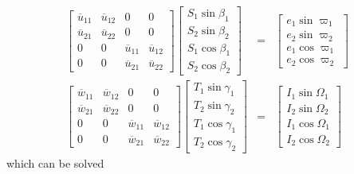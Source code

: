 \documentclass [12pt, a4paper] {article}
\begin{document}
\begin {eqnarray}
    \begin {bmatrix}
        \overline{u}_{11} & \overline{u}_{12} & 0 & 0 \\
        \overline{u}_{21} & \overline{u}_{22} & 0 & 0 \\
        0 & 0 & \overline{u}_{11} & \overline{u}_{12} \\
        0 & 0 & \overline{u}_{21} & \overline{u}_{22}
    \end {bmatrix}
    \begin {bmatrix}
        S_1\sin\beta_1 \\
        S_2\sin\beta_2 \\
        S_1\cos\beta_1 \\
        S_2\cos\beta_2 
    \end {bmatrix}
    &=& 
    \begin {bmatrix}
        e_1\sin\varpi_1 \\
        e_2\sin\varpi_2 \\
        e_1\cos\varpi_1 \\
        e_2\cos\varpi_2
    \end {bmatrix}
    \\
    \begin {bmatrix}
        \overline{w}_{11} & \overline{w}_{12} & 0 & 0 \\
        \overline{w}_{21} & \overline{w}_{22} & 0 & 0 \\
        0 & 0 & \overline{w}_{11} & \overline{w}_{12} \\
        0 & 0 & \overline{w}_{21} & \overline{w}_{22}
    \end {bmatrix}
    \begin {bmatrix}
        T_1\sin\gamma_1 \\
        T_2\sin\gamma_2 \\
        T_1\cos\gamma_1 \\
        T_2\cos\gamma_2 
    \end {bmatrix}
    &=& 
    \begin {bmatrix}
        I_1\sin\Omega_1 \\
        I_2\sin\Omega_2 \\
        I_1\cos\Omega_1 \\
        I_2\cos\Omega_2
    \end {bmatrix}
\end {eqnarray}
which can be solved 
\end{document}
